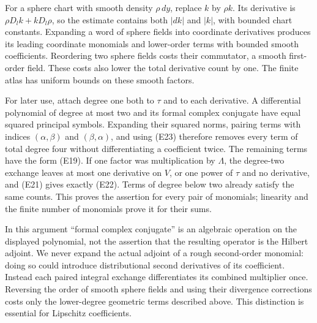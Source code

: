 \documentclass[
  11pt,
]{article}
\makeatletter
\let\ReaderOriginalAnchorStart\hyper@anchorstart
\let\ReaderOriginalAnchorEnd\hyper@anchorend
\let\ReaderPendingAliases\@empty
\def\ReaderArmAliases#1{\gdef\ReaderPendingAliases{#1}}
\def\hyper@anchorstart#1{\ReaderIfNativeAnchorTF{#1}{\ReaderPendingAliases\global\let\ReaderPendingAliases\@empty}{}\ReaderOriginalAnchorStart{#1}}
\makeatother
\begin{document}
For a sphere chart with smooth density \(\rho\,dy\), replace \(k\) by
\(\rho k\). Its derivative is \(\rho D_lk+kD_l\rho\), so the estimate
contains both \(|dk|\) and \(|k|\), with bounded chart constants.
Expanding a word of sphere fields into coordinate derivatives produces
its leading coordinate monomials and lower-order terms with bounded
smooth coefficients. Reordering two sphere fields costs their
commutator, a smooth first-order field. These costs also lower the total
derivative count by one. The finite atlas has uniform bounds on these
smooth factors.

For later use, attach degree one both to \(\tau\) and to each
derivative. A differential polynomial of degree at most two and its
formal complex conjugate have equal squared principal symbols. Expanding
their squared norms, pairing terms with indices \((\alpha,\beta)\) and
\((\beta,\alpha)\), and using (E23) therefore removes every term of
total degree four without differentiating a coefficient twice. The
remaining terms have the form (E19). If one factor was multiplication by
\(\Lambda\), the degree-two exchange leaves at most one derivative on
\(V\), or one power of \(\tau\) and no derivative, and (E21) gives
exactly (E22). Terms of degree below two already satisfy the same
counts. This proves the assertion for every pair of monomials; linearity
and the finite number of monomials prove it for their sums.

In this argument ``formal complex conjugate'' is an algebraic operation
on the displayed polynomial, not the assertion that the resulting
operator is the Hilbert adjoint. We never expand the actual adjoint of a
rough second-order monomial: doing so could introduce distributional
second derivatives of its coefficient. Instead each paired integral
exchange differentiates its combined multiplier once. Reversing the
order of smooth sphere fields and using their divergence corrections
costs only the lower-degree geometric terms described above. This
distinction is essential for Lipschitz coefficients.

\ReaderArmAliases{\ReaderOriginalAnchorStart{AN03-EXU-004}\ReaderOriginalAnchorEnd\begingroup\expandafter\def\csname @currentHref\endcsname{AN03-EXU-004}\label{AN03-EXU-004}\endgroup\ReaderOriginalAnchorStart{an03-exu-004-a-fourier-inequality-across-a-characteristic-shell}\ReaderOriginalAnchorEnd\begingroup\expandafter\def\csname @currentHref\endcsname{an03-exu-004-a-fourier-inequality-across-a-characteristic-shell}\label{an03-exu-004-a-fourier-inequality-across-a-characteristic-shell}\endgroup\ReaderOriginalAnchorStart{4-a-fourier-inequality-across-a-characteristic-shell}\ReaderOriginalAnchorEnd\begingroup\expandafter\def\csname @currentHref\endcsname{4-a-fourier-inequality-across-a-characteristic-shell}\label{4-a-fourier-inequality-across-a-characteristic-shell}\endgroup\ReaderOriginalAnchorStart{a-fourier-inequality-across-a-characteristic-shell}\ReaderOriginalAnchorEnd}
\end{document}
